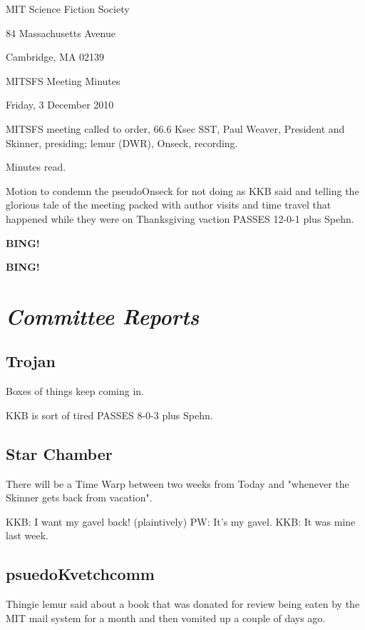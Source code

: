 \documentclass[10pt]{article}
\newcommand{\bing}{{\bf BING!} }
\newcommand{\goto}[1]{\bing \vskip 12pt \section*{{\em{#1}}}}
\newcommand{\ps}{ plus Spehn\xspace}
\newcommand{\skinner}{Paul Weaver, President and Skinner}
\newcommand{\onseck}{lemur (DWR), Onseck}
\newcommand{\meetingdate}{Friday, 3 December 2010}
\begin{document}
\begin{center}

MIT Science Fiction Society

84 Massachusetts Avenue

Cambridge, MA 02139

\vspace{12pt}

MITSFS Meeting Minutes

\meetingdate

\end{center}

\vspace{18pt}

\setlength{\parskip}{6pt}

\noindent
MITSFS meeting called to order, 66.6 Ksec SST,
\skinner, presiding; \onseck, recording.

Minutes read.

Motion to condemn the pseudoOnseck for not doing as KKB said and telling the
glorious tale of the meeting packed with author visits and time travel
that happened while they were on Thanksgiving vaction PASSES 12-0-1\ps.

\bing

\goto{Committee Reports}

\subsection*{Trojan}

Boxes of things keep coming in.

KKB is sort of tired PASSES 8-0-3\ps.

\subsection*{Star Chamber}

There will be a Time Warp between two weeks from Today and "whenever the
Skinner gets back from vacation".

KKB: I want my gavel back! (plaintively)
PW: It's my gavel.
KKB: It was mine last week.

\subsection*{psuedoKvetchcomm}

Thingie lemur said about a book that was donated for review being eaten by
the MIT mail system for a month and then vomited up a couple of days ago.
\end{document}
